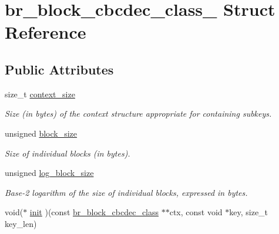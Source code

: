 \hypertarget{structbr__block__cbcdec__class__}{}\section{br\+\_\+block\+\_\+cbcdec\+\_\+class\+\_\+ Struct Reference}
\label{structbr__block__cbcdec__class__}
\subsection*{Public Attributes}
\begin{DoxyCompactItemize}
\item 
\mbox{\label{structbr__block__cbcdec__class___a3905f50afc18ac57e509e6fa3de7a6d6}} 
size\+\_\+t \hyperlink{structbr__block__cbcdec__class___a3905f50afc18ac57e509e6fa3de7a6d6}{context\+\_\+size}
\begin{DoxyCompactList}\small\item\em Size (in bytes) of the context structure appropriate for containing subkeys. \end{DoxyCompactList}\item 
\mbox{\label{structbr__block__cbcdec__class___a90d49ad45057502d5c317b88b196192f}} 
unsigned \hyperlink{structbr__block__cbcdec__class___a90d49ad45057502d5c317b88b196192f}{block\+\_\+size}
\begin{DoxyCompactList}\small\item\em Size of individual blocks (in bytes). \end{DoxyCompactList}\item 
\mbox{\label{structbr__block__cbcdec__class___a5ee75e036596d74d8acad3390105d590}} 
unsigned \hyperlink{structbr__block__cbcdec__class___a5ee75e036596d74d8acad3390105d590}{log\+\_\+block\+\_\+size}
\begin{DoxyCompactList}\small\item\em Base-\/2 logarithm of the size of individual blocks, expressed in bytes. \end{DoxyCompactList}\item 
void($\ast$ \hyperlink{structbr__block__cbcdec__class___af84792d60cd230b8ddda5ebce62a6252}{init} )(const \hyperlink{bearssl__block_8h_a5542970c820eeee2e62766368be8fb7f}{br\+\_\+block\+\_\+cbcdec\+\_\+class} $\ast$$\ast$ctx, const void $\ast$key, size\+\_\+t key\+\_\+len)
$$
\end{DoxyCompactItemize}
